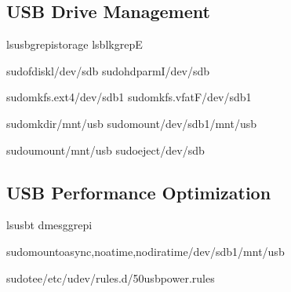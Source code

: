 \documentclass[letterpaper,10pt,english]{sphinxmanual}
\begin{document}
\subsection{USB Drive Management}
\label{\detokenize{storage-devices:usb-drive-management}}
\begin{sphinxVerbatim}[commandchars=\\\{\}]
lsusbgrep\PYGZhy{}istorage
lsblkgrep\PYGZhy{}E

sudofdisk\PYGZhy{}l/dev/sdb
sudohdparm\PYGZhy{}I/dev/sdb

sudomkfs.ext4/dev/sdb1
sudomkfs.vfat\PYGZhy{}F/dev/sdb1

sudomkdir/mnt/usb
sudomount/dev/sdb1/mnt/usb

sudoumount/mnt/usb
sudoeject/dev/sdb
\end{sphinxVerbatim}


\subsection{USB Performance Optimization}
\label{\detokenize{storage-devices:usb-performance-optimization}}
\begin{sphinxVerbatim}[commandchars=\\\{\}]
lsusb\PYGZhy{}t
dmesggrep\PYGZhy{}i

sudomount\PYGZhy{}oasync,noatime,nodiratime/dev/sdb1/mnt/usb

sudotee/etc/udev/rules.d/50\PYGZhy{}usb\PYGZhy{}power.rules
\end{sphinxVerbatim}
\end{document}
